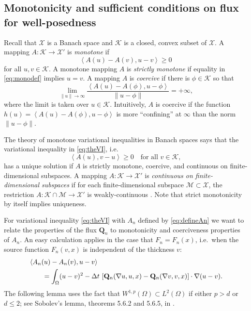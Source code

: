 \documentclass[final,leqno,onefignum,onetabnum]{siamltex1213bueler}
\newcommand\bQ{\mathbf{Q}}
\renewcommand{\grad}{\nabla}
\newcommand{\ip}[2]{\ensuremath{\left<#1,#2\right>}}
\begin{document}
\subsection{Monotonicity and sufficient conditions on flux for well-posedness} \label{subsec:mono}  Recall that $\mathcal{X}$ is a Banach space and $\mathcal{K}$ is a closed, convex subset of $\mathcal{X}$.  A mapping $A : \mathcal{K} \to \mathcal{X}'$ is \emph{monotone} \cite{KinderlehrerStampacchia1980} if
\begin{equation}
   \ip{A(u) - A(v)}{u-v} \ge 0  \label{eq:monodef}
\end{equation}
for all $u,v\in\mathcal{K}$.  A monotone mapping $A$ is \emph{strictly monotone} if equality in \eqref{eq:monodef} implies $u=v$.  A mapping $A$ is \emph{coercive} \cite{KinderlehrerStampacchia1980} if there is $\phi\in \mathcal{K}$ so that
\begin{equation}
   \lim_{\|u\|\to\infty} \frac{\ip{A(u) - A(\phi)}{u-\phi}}{\|u-\phi\|} = +\infty, \label{eq:coercivedef}
\end{equation}
where the limit is taken over $u\in\mathcal{K}$.  Intuitively, $A$ is coercive if the function $h(u)=\ip{A(u) - A(\phi)}{u-\phi}$ is more ``confining'' at $\infty$ than the norm $\|u-\phi\|$.

The theory of monotone variational inequalities in Banach spaces \cite[chapter III]{KinderlehrerStampacchia1980} says that the variational inequality in \eqref{eq:theVI}, i.e.
\begin{equation}
    \ip{A(u)}{v-u} \ge 0 \quad \text{for all $v\in\mathcal{K}$}, \label{eq:VIabstract}
\end{equation}
has a unique solution if $A$ is strictly monotone, coercive, and continuous on finite-dimensional subspaces.  A mapping $A : \mathcal{K} \to \mathcal{X}'$ is \emph{continuous on finite-dimensional subspaces} if for each finite-dimensional subspace $\mathcal{M} \subset \mathcal{X}$, the restriction $A : \mathcal{K}\cap \mathcal{M} \to \mathcal{X}'$ is weakly-continuous \cite{KinderlehrerStampacchia1980}.  Note that strict monotonicity by itself implies uniqueness.

For variational inequality \eqref{eq:theVI} with $A_n$ defined by \eqref{eq:defineAn} we want to relate the properties of the flux $\bQ_n$ to monotonicity and coerciveness properties of $A_n$.  An easy calculation applies in the case that $F_n=F_n(x)$, i.e.~when the source function $F_n(v,x)$ is independent of the thickness $v$:
\begin{align}
   &\ip{A_n(u) - A_n(v)}{u-v}  \label{eq:AtoQcalculation} \\
   &\qquad = \int_\Omega (u-v)^2 - \Delta t\, \left[\bQ_n(\grad u,u,x) - \bQ_n(\grad v,v,x)\right] \cdot \grad(u-v).  \notag
\end{align}
The following lemma uses the fact that $W^{1,p}(\Omega) \subset L^2(\Omega)$ if either $p>d$ or $d\le 2$; see Sobolev's lemma, theorems 5.6.2 and 5.6.5, in \cite{Evans1998}.
\end{document}
